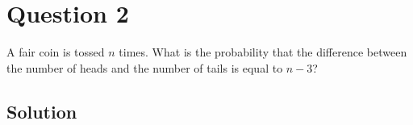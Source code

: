 \section*{Question 2}

A fair coin is tossed \(n\) times.
What is the probability that the difference between the number of heads and the number of tails is equal to \(n - 3\)?

\subsection*{Solution}
